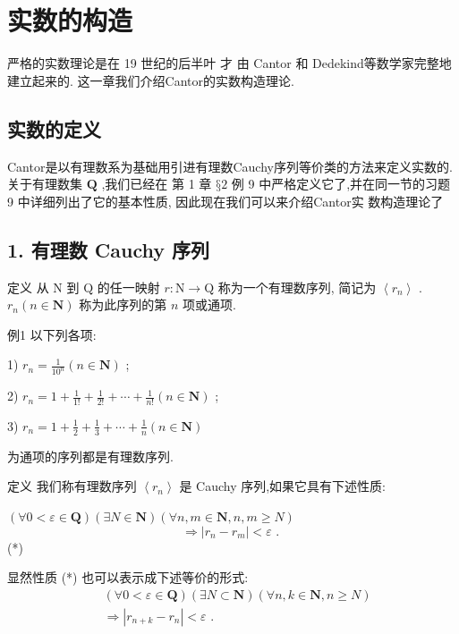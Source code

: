 

\chapter{实数的构造}

严格的实数理论是在 19 世纪的后半叶 才 由 Cantor 和 Dedekind等数学家完整地建立起来的. 这一章我们介绍Cantor的实数构造理论.

\section{实数的定义}

Cantor是以有理数系为基础用引进有理数Cauchy序列等价类的方法来定义实数的. 关于有理数集 $\mathbf{Q}$ ,我们已经在 第 1 章 $§2$ 例 9 中严格定义它了,并在同一节的习题 9 中详细列出了它的基本性质, 因此现在我们可以来介绍Cantor实 数构造理论了

\section*{1. 有理数 Cauchy 序列}

定义 从 $\mathrm{N}$ 到 $\mathrm{Q}$ 的任一映射 $r : \mathrm{N} \rightarrow  \mathrm{Q}$ 称为一个有理数序列, 简记为 $\left\langle  {r}_{n}\right\rangle$ . ${r}_{n}\left( {n \in  \mathbf{N}}\right)$ 称为此序列的第 $n$ 项或通项.

例1 以下列各项:

1) ${r}_{n} = \frac{1}{{10}^{n}}\left( {n \in  \mathbf{N}}\right)$ ;

2) ${r}_{n} = 1 + \frac{1}{1!} + \frac{1}{2!} + \cdots  + \frac{1}{n!}\left( {n \in  \mathbf{N}}\right)$ ;

3) ${r}_{n} = 1 + \frac{1}{2} + \frac{1}{3} + \cdots  + \frac{1}{n}\left( {n \in  \mathbf{N}}\right)$

为通项的序列都是有理数序列.

定义 我们称有理数序列 $\left\langle  {r}_{n}\right\rangle$ 是 Cauchy 序列,如果它具有下述性质:

$\left( {\forall 0 < \varepsilon  \in  \mathbf{Q}}\right) \left( {\exists N \in  \mathbf{N}}\right) \left( {\forall n,m \in  \mathbf{N},n,m \geq  N}\right)$
$$\Rightarrow  \left| {{r}_{n} - {r}_{m}}\right|  < \varepsilon \text{ . }$$
(*)

显然性质 (*) 也可以表示成下述等价的形式:
\begin{align*}
	&\left( {\forall 0 < \varepsilon  \in  \mathbf{Q}}\right) \left( {\exists N \subset  \mathbf{N}}\right) \left( {\forall n,k \in  \mathbf{N},n \geq  N}\right)\\
	&\Rightarrow  \left| {{r}_{n + k} - {r}_{n}}\right|  < \varepsilon \text{ . }
\end{align*}

